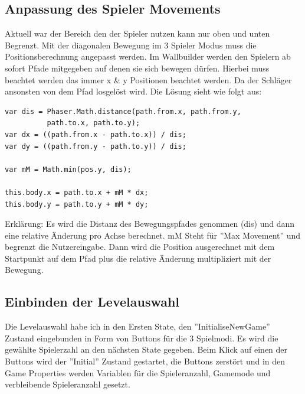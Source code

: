 \subsection{Anpassung des Spieler Movements}
Aktuell war der Bereich den der Spieler nutzen kann nur oben und unten Begrenzt. Mit der diagonalen Bewegung im 3 Spieler Modus muss die Positionsberechnung angepasst werden.
\newline
Im Wallbuilder werden den Spielern ab sofort Pfade mitgegeben auf denen sie sich bewegen dürfen. Hierbei muss beachtet werden das immer x \& y Positionen beachtet werden. Da der Schläger ansonsten von dem Pfad losgelöst wird.
\newline
Die Lösung sieht wie folgt aus:
\newline
\begin{lstlisting}
var dis = Phaser.Math.distance(path.from.x, path.from.y, 
          path.to.x, path.to.y);
var dx = ((path.from.x - path.to.x)) / dis;
var dy = ((path.from.y - path.to.y)) / dis;

var mM = Math.min(pos.y, dis);

this.body.x = path.to.x + mM * dx;
this.body.y = path.to.y + mM * dy;
\end{lstlisting}
Erklärung:
\newline
Es wird die Distanz des Bewegungspfades genommen (dis) und dann eine relative Änderung pro Achse berechnet.
\newline
mM Steht für ''Max Movement'' und begrenzt die Nutzereingabe.
\newline
Dann wird die Position ausgerechnet mit dem Startpunkt auf dem Pfad plus die relative Änderung multipliziert mit der Bewegung.
\subsection{Einbinden der Levelauswahl}
Die Levelauswahl habe ich in den Ersten State, den ''InitialiseNewGame'' Zustand eingebunden in Form von Buttons für die 3 Spielmodi.
Es wird die gewählte Spielerzahl an den nächsten State gegeben.
\newline
Beim Klick auf einen der Buttons wird der ''Initial'' Zustand gestartet, die Buttons zerstört und in den Game Properties werden Variablen für die Spieleranzahl, Gamemode und verbleibende Spieleranzahl gesetzt.
